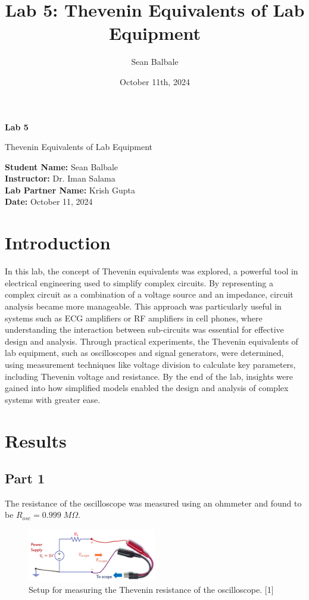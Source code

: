 \documentclass{article}
\title{Lab 5: Thevenin Equivalents of Lab Equipment}
\author{Sean Balbale}
\date{October 11th, 2024}
\begin{document}
\begin{titlepage}
	\begin{center}
		\vspace*{1in}

		\Huge
		\textbf{Lab 5}

		\LARGE
		Thevenin Equivalents of Lab Equipment

		\vspace{3 in}

		\textbf{Student Name:} Sean Balbale
		\\ \textbf{Instructor:} Dr. Iman Salama
		\\ \textbf{Lab Partner Name:} Krish Gupta
		\\ \textbf{Date:} October 11, 2024

		\vfill


	\end{center}
\end{titlepage}

\newpage

\section{Introduction}
In this lab, the concept of Thevenin equivalents was explored, a powerful tool
in electrical engineering used to simplify complex circuits. By representing a
complex circuit as a combination of a voltage source and an impedance, circuit
analysis became more manageable. This approach was particularly useful in
systems such as ECG amplifiers or RF amplifiers in cell phones, where
understanding the interaction between sub-circuits was essential for effective
design and analysis. Through practical experiments, the Thevenin equivalents of
lab equipment, such as oscilloscopes and signal generators, were determined,
using measurement techniques like voltage division to calculate key parameters,
including Thevenin voltage and resistance. By the end of the lab, insights were
gained into how simplified models enabled the design and analysis of complex
systems with greater ease.

\section{Results}
\subsection*{Part 1}
The resistance of the oscilloscope was measured using an ohmmeter and found to be 
$R_{osc} = 0.999 \; M\Omega$.
\begin{figure}[H]
	\centering
	\includegraphics[width=0.5\textwidth]{oscilloscope resistance.png}
	\caption{Setup for measuring the Thevenin resistance of the oscilloscope. [1]}
	\label{fig:fig1}
\end{figure}
\end{document}
